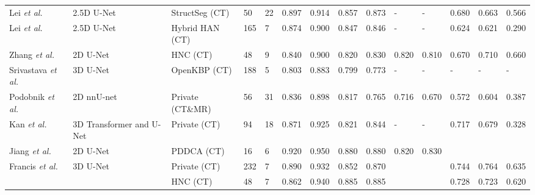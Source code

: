 \documentclass[lettersize,journal]{IEEEtran}
\begin{document}
{\begin{table*}[ht!]
{\begin{tabular}{@{}llllllllllllll@{}}
Lei {\it{et al.}} \cite{47}                      & 2.5D U-Net                & StructSeg (CT)        & 50       & 22         & 0.897     & 0.914    & 0.857           & 0.873           & -                  & -                  & 0.680          & 0.663          & 0.566  \\
Lei {\it{et al.}} \cite{47}                      & 2.5D U-Net                & Hybrid HAN (CT)       & 165      & 7          & 0.874     & 0.900    & 0.847           & 0.846           & -                  & -                  & 0.624          & 0.621          & 0.290  \\
Zhang {\it{et al.}} \cite{48}                     & 2D U-Net                  & HNC (CT) \cite{30}     & 48       & 9          & 0.840     & 0.900    & 0.820           & 0.830           & 0.820              & 0.810              & 0.670          & 0.710          & 0.660  \\
Srivastava {\it{et al.}} \cite{49}              & 3D U-Net                  & OpenKBP (CT) \cite{35} & 188      & 5          & 0.803     & 0.883    & 0.799           & 0.773           & -                  & -                  & -              & -              & -      \\
Podobnik {\it{et al.}} \cite{50}                 & 2D nnU-net                & Private (CT\&MR)      & 56       & 31         & 0.836     & 0.898    & 0.817           & 0.765           & 0.716              & 0.670              & 0.572          & 0.604          & 0.387  \\
Kan {\it{et al.}} \cite{51}                      & 3D Transformer and U-Net  & Private (CT)          & 94       & 18         & 0.871     & 0.925    & 0.821           & 0.844           & -                  & -                  & 0.717          & 0.679          & 0.328  \\
Jiang {\it{et al.}} \cite{52}                     & 2D U-Net                  & PDDCA (CT) \cite{30}   & 16       & 6          & 0.920     & 0.950    & 0.880           & 0.880           & 0.820              & 0.830              &                &                &        \\
\multirow{2}{*}{Francis {\it{et al.}} \cite{53}}  & \multirow{2}{*}{3D U-Net} & Private (CT)          & 232      & 7          & 0.890     & 0.932    & 0.852           & 0.870           &                    &                    & 0.744          & 0.764          & 0.635  \\
                                        &                           & HNC (CT)  \cite{30}     & 48       & 7          & 0.862     & 0.940    & 0.885           & 0.885           &                    &                    & 0.728          & 0.723          & 0.620  \\

\end{tabular}}
\end{table*}}
\end{document}
